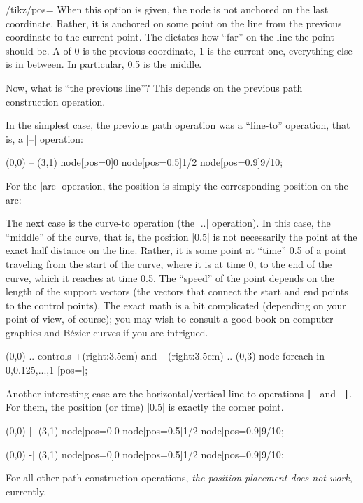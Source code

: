 \begin{key}{/tikz/pos=}
  When this option is given, the node is not anchored on the last
  coordinate. Rather, it is anchored on some point on the line from
  the previous coordinate to the current point. The 
  dictates how ``far'' on the line the point should be. A
   of 0 is the previous coordinate, 1 is the current
  one, everything else is in between. In particular, 0.5 is the
  middle.

  Now, what is ``the previous line''? This depends on the previous
  path construction operation.

  In the simplest case, the previous path operation was a ``line-to''
  operation, that is, a  |--| operation:
\begin{codeexample}[]
\tikz \draw (0,0) -- (3,1)
    node[pos=0]{0} node[pos=0.5]{1/2} node[pos=0.9]{9/10};
\end{codeexample}

  For the |arc| operation, the position is simply the corresponding
  position on the arc:
\begin{codeexample}[]
\end{codeexample}

  The next case is the curve-to operation (the |..| operation). In this
  case, the ``middle'' of the curve, that is, the position |0.5| is
  not necessarily the point at the exact half distance on the
  line. Rather, it is some point at ``time'' 0.5 of a point traveling
  from the start of the curve, where it is at time 0, to the end of
  the curve, which it reaches at time 0.5. The ``speed'' of the point
  depends on the length of the support vectors (the vectors that
  connect the start and end points to the control points). The exact
  math is a bit complicated (depending on your point of view, of
  course); you may wish to consult a good book on computer graphics
  and B\'ezier curves if you are intrigued.
\begin{codeexample}[]
\tikz \draw (0,0) .. controls +(right:3.5cm) and +(right:3.5cm) .. (0,3)
  node foreach \p in {0,0.125,...,1} [pos=\p]{\p};
\end{codeexample}

  Another interesting case are the horizontal/vertical line-to operations
  \verb!|-! and \verb!-|!. For them, the position (or time) |0.5| is
  exactly the corner point.

\begin{codeexample}[]
\tikz \draw (0,0) |- (3,1)
  node[pos=0]{0} node[pos=0.5]{1/2} node[pos=0.9]{9/10};
\end{codeexample}

\begin{codeexample}[]
\tikz \draw (0,0) -| (3,1)
  node[pos=0]{0} node[pos=0.5]{1/2} node[pos=0.9]{9/10};
\end{codeexample}

  For all other path construction operations, \emph{the position
  placement does not work}, currently.
\end{key}

